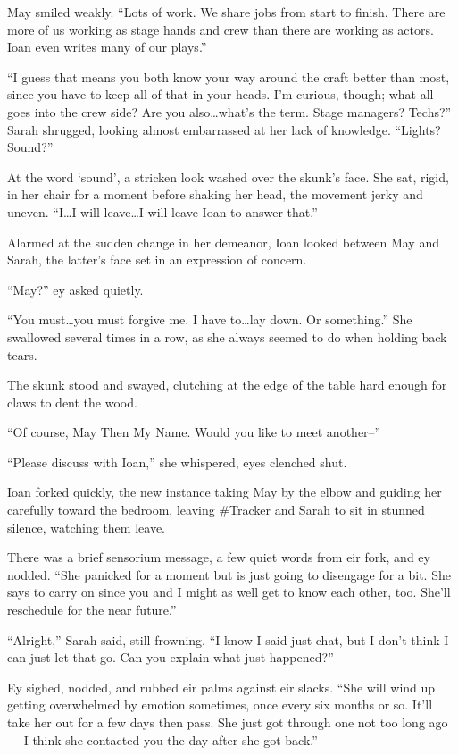 May smiled weakly. ``Lots of work. We share jobs from start to finish. There are more of us working as stage hands and crew than there are working as actors. Ioan even writes many of our plays.''

``I guess that means you both know your way around the craft better than most, since you have to keep all of that in your heads. I'm curious, though; what all goes into the crew side? Are you also\ldots what's the term. Stage managers? Techs?'' Sarah shrugged, looking almost embarrassed at her lack of knowledge. ``Lights? Sound?''

At the word `sound', a stricken look washed over the skunk's face. She sat, rigid, in her chair for a moment before shaking her head, the movement jerky and uneven. ``I\ldots I will leave\ldots I will leave Ioan to answer that.''

Alarmed at the sudden change in her demeanor, Ioan looked between May and Sarah, the latter's face set in an expression of concern.

``May?'' ey asked quietly.

``You must\ldots you must forgive me. I have to\ldots lay down. Or something.'' She swallowed several times in a row, as she always seemed to do when holding back tears.

The skunk stood and swayed, clutching at the edge of the table hard enough for claws to dent the wood.

``Of course, May Then My Name. Would you like to meet another--''

``Please discuss with Ioan,'' she whispered, eyes clenched shut.

Ioan forked quickly, the new instance taking May by the elbow and guiding her carefully toward the bedroom, leaving \#Tracker and Sarah to sit in stunned silence, watching them leave.

There was a brief sensorium message, a few quiet words from eir fork, and ey nodded. ``She panicked for a moment but is just going to disengage for a bit. She says to carry on since you and I might as well get to know each other, too. She'll reschedule for the near future.''

``Alright,'' Sarah said, still frowning. ``I know I said just chat, but I don't think I can just let that go. Can you explain what just happened?''

Ey sighed, nodded, and rubbed eir palms against eir slacks. ``She will wind up getting overwhelmed by emotion sometimes, once every six months or so. It'll take her out for a few days then pass. She just got through one not too long ago — I think she contacted you the day after she got back.''

